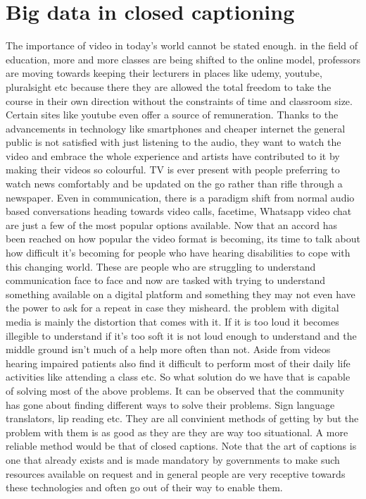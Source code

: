 \documentclass[sigconf]{acmart}
\begin{document}
\section{Big data in closed captioning}

The importance of video in today's world cannot be stated enough. in the field of education, more and more classes are being shifted to the online model, professors are moving towards keeping their lecturers in places like udemy, youtube, pluralsight etc because there they are allowed the total freedom to take the course in their own direction without the constraints of time and classroom size. Certain sites like youtube even offer a source of remuneration. Thanks to the advancements in technology like smartphones and cheaper internet the general public is not satisfied with just listening to the audio, they want to watch the video and embrace the whole experience and artists have contributed to it by making their videos so colourful. TV is ever present with people preferring to watch news comfortably and be updated on the go rather than rifle through a newspaper. Even in communication, there is a paradigm shift from normal audio based conversations heading towards video calls, facetime, Whatsapp video chat are just a few of the most popular options available.
\newline
Now that an accord has been reached on how popular the video format is becoming, its time to talk about how difficult it's becoming for people who have hearing disabilities to cope with this changing world. These are people who are struggling to understand communication face to face and now are tasked with trying to understand something available on a digital platform and something they may not even have the power to ask for a repeat in case they misheard. the problem with digital media is mainly the distortion that comes with it. If it is too loud it becomes illegible to understand if it's too soft it is not loud enough to understand and the middle ground isn't much of a help more often than not. Aside from videos hearing impaired patients also find it difficult to perform most of their daily life activities like attending a class etc.
\newline
So what solution do we have that is capable of solving most of the above problems. It can be observed that the community has gone about finding different ways to solve their problems. Sign language translators, lip reading etc. They are all convinient methods of getting by but the problem with them is as good as they are they are way too situational. A more reliable method would be that of closed captions. Note that the art of captions is one that already exists and is made mandatory by governments to make such resources available on request and in general people are very receptive towards these technologies and often go out of their way to enable them.
\end{document}
